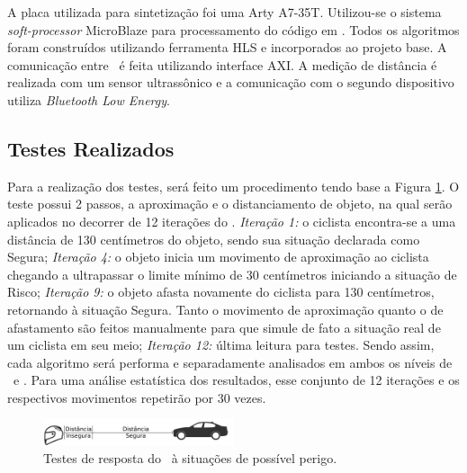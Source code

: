     
        A placa utilizada para sintetização foi uma Arty A7-35T.%
        Utilizou-se o sistema \textit{soft-processor} MicroBlaze para processamento do código em \software.
        Todos os algoritmos foram construídos utilizando ferramenta HLS  e incorporados ao projeto base.
        A comunicação entre \hs\ é feita utilizando interface AXI.
        A medição de distância é realizada com um sensor ultrassônico e a comunicação com o segundo dispositivo utiliza \textit{Bluetooth Low Energy}.
        
        
    \subsection{Testes Realizados}
        Para a realização dos testes, será feito um procedimento tendo base a Figura \ref{fig:distance}. 
        O teste possui 2 passos, a aproximação e o distanciamento de objeto, na qual serão aplicados no decorrer de 12 iterações do \wearable.
        \textit{Iteração 1:} o ciclista encontra-se a uma distância de 130 centímetros do objeto, sendo sua situação declarada como Segura;
        \textit{Iteração 4:} o objeto inicia um movimento de aproximação ao ciclista chegando a ultrapassar o limite mínimo de 30 centímetros iniciando a situação de Risco;
        \textit{Iteração 9:} o objeto afasta novamente do ciclista para 130 centímetros, retornando à situação Segura.
        Tanto o movimento de aproximação quanto o de afastamento são feitos manualmente para que simule de fato a situação real de um ciclista em seu meio;
        \textit{Iteração 12:} última leitura para testes.
        Sendo assim, cada algoritmo será performa e separadamente analisados em ambos os níveis de \software\ e \hardware.
        Para uma análise estatística dos resultados, esse conjunto de 12 iterações e os respectivos movimentos repetirão por 30 vezes.

        \begin{figure}[h] \centering
            \vspace{-1em}
            \includegraphics[width=0.5\textwidth]{img/distance.png}
            \caption{Testes de resposta do \wearable\ à situações de possível perigo.}
            \label{fig:distance}
        \end{figure}

